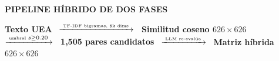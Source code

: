 \documentclass[9pt,a4paper]{article}
\newcommand{\SECTHEAD}[1]{%
  {\footnotesize\bfseries\color{uamblue}\MakeUppercase{#1}}\par\vspace{2pt}}
\begin{document}
\vspace{3pt}

\begin{tcolorbox}[grayband]
\SECTHEAD{pipeline híbrido de dos fases}
\centering
{\small\textbf{\color{navy}Texto UEA}}~%
$\xrightarrow{\;\text{\tiny TF-IDF bigramas, 8k dims}\;}$~%
{\small\textbf{\color{navy}Similitud coseno $626\!\times\!626$}}~%
$\xrightarrow{\;\text{\tiny umbral }s\geq0.20\;}$~%
{\small\textbf{\color{navy}1,505 pares candidatos}}~%
$\xrightarrow{\;\text{\tiny LLM re-evalúa}\;}$~%
{\small\textbf{\color{uamred}Matriz híbrida $626\!\times\!626$}}
\end{tcolorbox}

\vspace{3pt}
\end{document}
